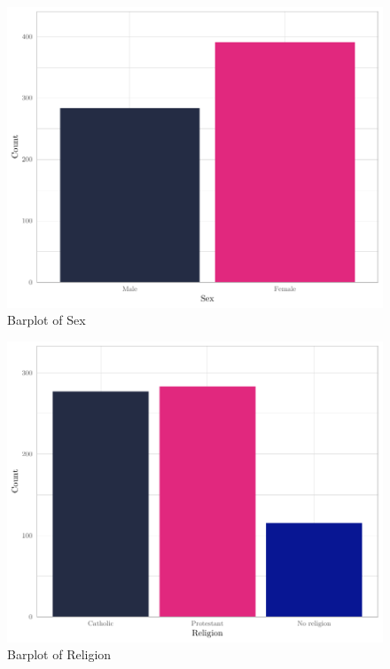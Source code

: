 \documentclass[
]{article}
\begin{document}
\begin{figure}[H]

{\centering \includegraphics[width=0.8\linewidth]{paper_files/figure-latex/unnamed-chunk-5-1} 

}

\caption{Barplot of Sex}\label{fig:unnamed-chunk-5}
\end{figure}

\begin{figure}[H]

{\centering \includegraphics[width=0.8\linewidth]{paper_files/figure-latex/unnamed-chunk-6-1} 

}

\caption{Barplot of Religion}\label{fig:unnamed-chunk-6}
\end{figure}
\end{document}
